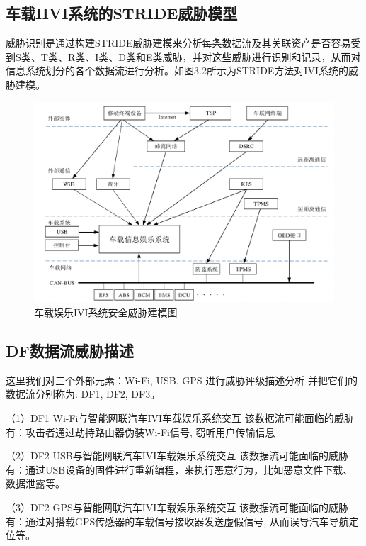 \subsection{车载IIVI系统的STRIDE威胁模型}
威胁识别是通过构建STRIDE威胁建模来分析每条数据流及其关联资产是否容易受到S类、T类、R类、I类、D类和E类威胁，并对这些威胁进行识别和记录，从而对信息系统划分的各个数据流进行分析。如图3.2所示为STRIDE方法对IVI系统的威胁建模。
\begin{figure}
  \centering
  \includegraphics[scale=0.6]{resources/img/i33.png}
  \caption{车载娱乐IVI系统安全威胁建模图}
\end{figure}
\subsection{DF数据流威胁描述}
这里我们对三个外部元素：Wi-Fi, USB, GPS 进行威胁评级描述分析
并把它们的数据流分别称为: DF1, DF2, DF3。

（1）DF1 Wi-Fi与智能网联汽车IVI车载娱乐系统交互
该数据流可能面临的威胁有：攻击者通过劫持路由器伪装Wi-Fi信号, 窃听用户传输信息\cite{berghel2005Wi-Fi}

（2）DF2 USB与智能网联汽车IVI车载娱乐系统交互
该数据流可能面临的威胁有：通过USB设备的固件进行重新编程，来执行恶意行为，比如恶意文件下载、数据泄露等\cite{nissim2017usb}。

（3）DF2 GPS与智能网联汽车IVI车载娱乐系统交互
该数据流可能面临的威胁有：通过对搭载GPS传感器的车载信号接收器发送虚假信号, 从而误导汽车导航定位等\cite{alamleh2020cheat}。
